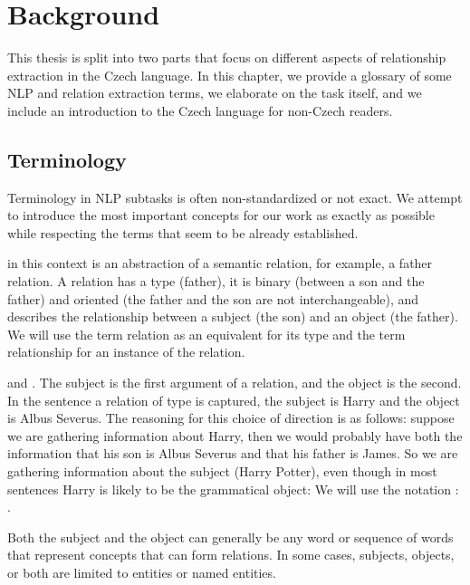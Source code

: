 \chapter{Background}

This thesis is split into two parts that focus on different aspects of relationship extraction in the Czech language. In this chapter, we provide a glossary of some NLP and relation extraction terms, we elaborate on the task itself, and we include an introduction to the Czech language for non-Czech readers.


\section{Terminology}
Terminology in NLP subtasks is often non-standardized or not exact. We attempt to introduce the most important concepts for our work as exactly as possible while respecting the terms that seem to be already established. 


 in this context is an abstraction of a semantic relation, for example, a father relation. A relation has a type (father), it is binary (between a son and the father) and oriented (the father and the son are not interchangeable), and describes the relationship between a subject (the son) and an object (the father). We will use the term relation as an equivalent for its type and the term relationship for an instance of the relation. 


 and . The subject is the first argument of a relation, and the object is the second. In the sentence  a relation of type  is captured, the subject is Harry and the object is Albus Severus. The reasoning for this choice of direction is as follows: suppose we are gathering information about Harry, then we would probably have both the information that his son is Albus Severus and that his father is James. So we are gathering information about the subject (Harry Potter), even though in most sentences Harry is likely to be the grammatical object:  We will use the notation : . 



Both the subject and the object can generally be any word or sequence of words that represent concepts that can form relations. In some cases, subjects, objects, or both are limited to entities or named entities.


